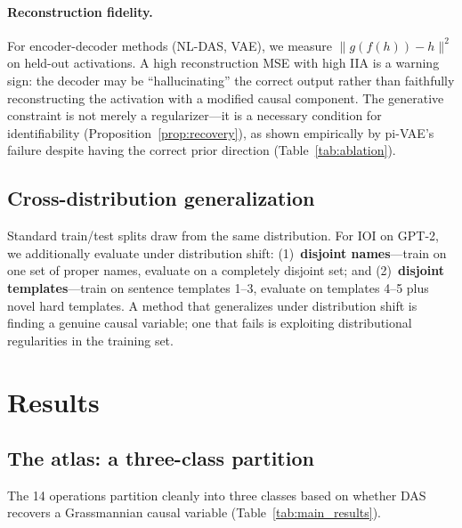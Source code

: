 \documentclass{article}
\begin{document}
\paragraph{Reconstruction fidelity.}
For encoder-decoder methods (NL-DAS, VAE), we measure $\|g(f(h)) - h\|^2$ on
held-out activations. A high reconstruction MSE with high IIA is a warning sign:
the decoder may be ``hallucinating'' the correct output rather than faithfully
reconstructing the activation with a modified causal component.
The generative constraint is not merely a regularizer---it is a necessary
condition for identifiability (Proposition~\ref{prop:recovery}), as shown
empirically by pi-VAE's failure despite having the correct prior direction
(Table~\ref{tab:ablation}).

\subsection{Cross-distribution generalization}
\label{sec:cross_distribution}

Standard train/test splits draw from the same distribution. For IOI on GPT-2, we
additionally evaluate under distribution shift: (1)~\textbf{disjoint names}---train
on one set of proper names, evaluate on a completely disjoint set; and
(2)~\textbf{disjoint templates}---train on sentence templates 1--3, evaluate on
templates 4--5 plus novel hard templates. A method that generalizes under
distribution shift is finding a genuine causal variable; one that fails is
exploiting distributional regularities in the training set.


\section{Results}
\label{sec:results}

\subsection{The atlas: a three-class partition}

The 14 operations partition cleanly into three classes based on whether DAS
recovers a Grassmannian causal variable (Table~\ref{tab:main_results}).
\end{document}
